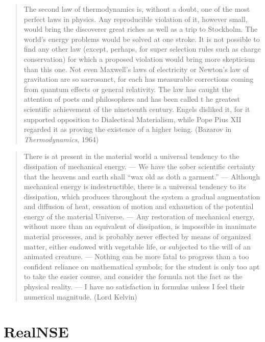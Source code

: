 \small
\begin{quote} The second law of thermodynamics is, without a doubt, one of 
the most perfect laws in physics. Any reproducible violation of it, however 
small, would bring the discoverer great riches as well as a trip to Stockholm. 
The world's energy problems would be solved at one stroke. It is not 
possible to find any other law (except, perhaps, for super selection rules 
such as charge conservation) for which a proposed violation would bring more 
skepticism than this one. Not even Maxwell's laws of electricity or 
Newton's law of gravitation are so sacrosanct, for each has measurable 
corrections coming from quantum effects or general relativity. The law 
has caught the attention of poets and philosophers and has been called t
he greatest scientific achievement of the nineteenth century. Engels 
disliked it, for it supported opposition to Dialectical Materialism, 
while Pope Pius XII regarded it as proving the existence of a higher being.
(Bazarov in \emph{Thermodynamics}, 1964)
\end{quote}
\begin{quote}
There is at present in the material world a universal tendency to the 
dissipation of mechanical energy. --- We have the sober scientific 
certainty that 
the heavens and earth shall ``wax old as doth a garment.'' ---
Although mechanical energy is indestructible, there is a universal tendency 
to its dissipation, which produces throughout the system a gradual 
augmentation and diffusion of heat, cessation of motion and exhaustion 
of the potential energy of the material Universe. ---
Any restoration of mechanical energy, without more than an equivalent 
of dissipation, is impossible in inanimate material processes, and is 
probably never effected by means of organized matter, either endowed 
with vegetable life, or subjected to the will of an animated creature.
 --- Nothing can be more fatal to progress than a too confident reliance 
on mathematical symbols; for the student is only too apt to take the 
easier course, and consider the formula not the fact as the physical 
reality. --- I have no satisfaction in formulas unless I feel their 
numerical magnitude.
(Lord Kelvin)
\end{quote}
\normalsize




\fi  %

\chapter{RealNSE}
\small

